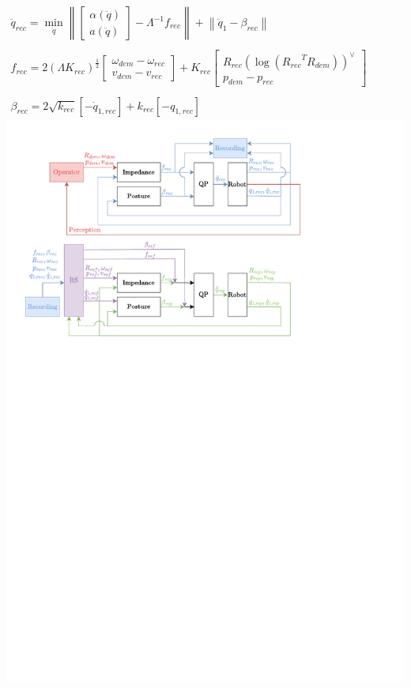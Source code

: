 \documentclass[11pt]{report}
\numberwithin{equation}{section}        %
\numberwithin{figure}{section}          %
\numberwithin{table}{section}           %
\begin{document}
$\begin{array}{l}
\ddot{q}_{rec} = \min\limits_{\ddot{q}}\left \|  \begin{bmatrix}
\alpha(\ddot{q})\\ 
a(\ddot{q})
\end{bmatrix} - \Lambda^{-1}f_{rec} \right \| + \left \| \ddot{q}_1-\beta_{rec} \right \|\\\\
f_{rec} =2(\Lambda K_{rec})^{\frac{1}{2}} \begin{bmatrix}
\omega_{dem} - \omega_{rec}
\\ 
v_{dem}-v_{rec}
\end{bmatrix} + K_{rec} \begin{bmatrix}
R_{rec}(\log({R_{rec}}^TR_{dem}))^{\vee }\\ 
p_{dem}-p_{rec}
\end{bmatrix}\\\\
\beta_{rec} = 2\sqrt{k_{rec}}\left [ -\dot{q}_{1,rec}  \right ] + k_{rec}\left [ -q_{1,rec}  \right ]

\end{array}$\\
\includegraphics[trim={1cm 23.3cm 5cm 1cm}, clip]{Graphics/qp.pdf}\\
\end{document}
